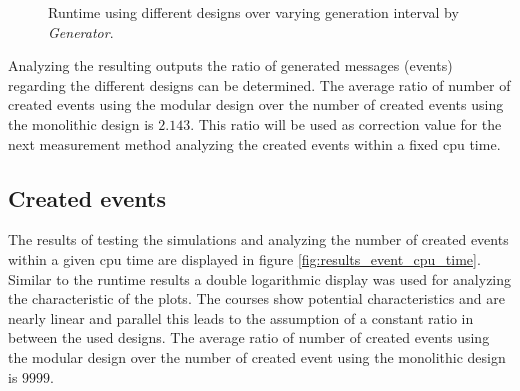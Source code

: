 \begin{figure}
    \centering
    \caption{Runtime using different designs over varying generation interval by \emph{Generator}.}
    \label{fig:results_runtime_generation}
\end{figure}


Analyzing the resulting outputs the ratio of generated messages (events) regarding the different designs can be determined.
The average ratio of number of created events using the modular design over the number of created events using the monolithic design is $2.143$.
This ratio will be used as correction value for the next measurement method analyzing the created events within a fixed cpu time.

\subsection{Created events}
\label{sec:measurements_sequential_event}

The results of testing the simulations and analyzing the number of created events within a given cpu time are displayed in figure \ref{fig:results_event_cpu_time}.
Similar to the runtime results a double logarithmic display was used for analyzing the characteristic of the plots.
The courses show potential characteristics and are nearly linear and parallel this leads to the assumption of a constant ratio in between the used designs.
The average ratio of number of created events using the modular design over the number of created event using the monolithic design is $9999$. %
\\


